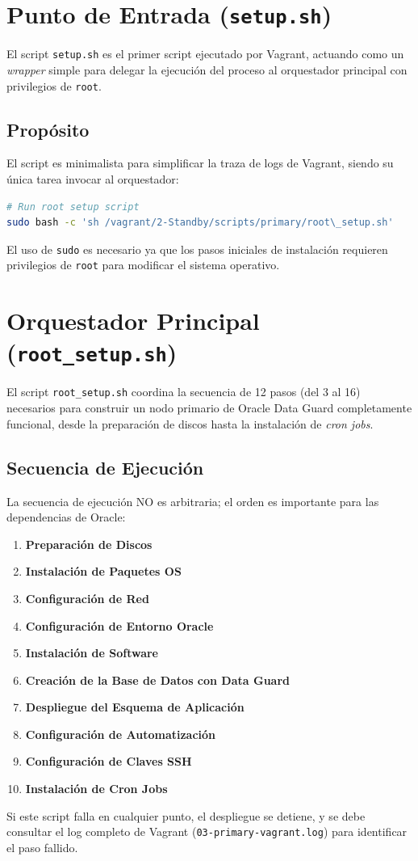 \documentclass[11pt, a4paper]{report}
\begin{document}
\section{Punto de Entrada (\texttt{setup.sh})}

El script \texttt{setup.sh} es el primer script ejecutado por Vagrant, actuando como un \textit{wrapper} simple para delegar la ejecución del proceso al orquestador principal con privilegios de \texttt{root}.
\subsection{Propósito}
El script es minimalista para simplificar la traza de logs de Vagrant, siendo su única tarea invocar al orquestador:
\begin{lstlisting}[language=bash, caption={Invocación del Orquestador}]
# Run root setup script
sudo bash -c 'sh /vagrant/2-Standby/scripts/primary/root\_setup.sh'
\end{lstlisting}
El uso de \texttt{sudo} es necesario ya que los pasos iniciales de instalación requieren privilegios de \texttt{root} para modificar el sistema operativo.
\section{Orquestador Principal (\texttt{root\_setup.sh})}

El script \texttt{root\_setup.sh} coordina la secuencia de 12 pasos (del 3 al 16) necesarios para construir un nodo primario de Oracle Data Guard completamente funcional, desde la preparación de discos hasta la instalación de \textit{cron jobs}.
\subsection{Secuencia de Ejecución}
La secuencia de ejecución NO es arbitraria; el orden es importante para las dependencias de Oracle:
\begin{enumerate}
    \item \textbf{Preparación de Discos}
    \item \textbf{Instalación de Paquetes OS}
    \item \textbf{Configuración de Red}
    \item \textbf{Configuración de Entorno Oracle}
    \item \textbf{Instalación de Software}
    \item \textbf{Creación de la Base de Datos con Data Guard}
    \item \textbf{Despliegue del Esquema de Aplicación}
    \item \textbf{Configuración de Automatización}
    \item \textbf{Configuración de Claves SSH}
    \item \textbf{Instalación de Cron Jobs}
\end{enumerate}
Si este script falla en cualquier punto, el despliegue se detiene, y se debe consultar el log completo de Vagrant (\texttt{03-primary-vagrant.log}) para identificar el paso fallido.
\end{document}
